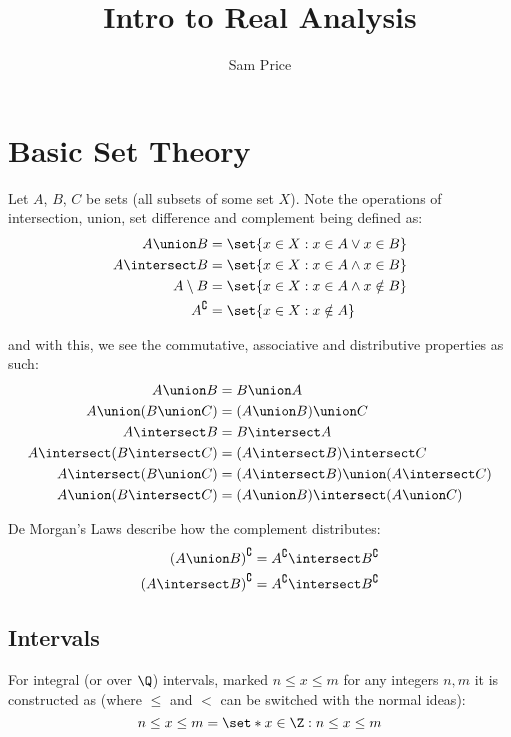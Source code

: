 \documentclass{article}
\title{Intro to Real Analysis}
\author{Sam Price}
\begin{document}
\maketitle

\section{Basic Set Theory}
Let $A$, $B$, $C$ be sets (all subsets of some set $X$).
Note the operations of intersection, union, set difference and complement being defined as:
\begin{align}
  A \union B &= \set{x \in X : x \in A \lor x \in B}\\
  A \intersect B &= \set{x \in X : x \in A \land x \in B}\\
  A \setminus B &= \set{x \in X : x \in A \land x \notin B}\\
  A^{\complement} &= \set{x \in X : x \notin A}
\end{align}

and with this, we see the commutative, associative and distributive properties as such:
\begin{align}
  A \union B &= B \union A\\
  A \union (B \union C) &= (A \union B) \union C\\
  A \intersect B &= B \intersect A\\
  A \intersect (B \intersect C) &= (A \intersect B) \intersect C\\
  A \intersect (B \union C) &= (A \intersect B) \union (A \intersect C)\\
  A \union (B \intersect C) &= (A \union B) \intersect (A \union C)
\end{align}

De Morgan's Laws describe how the complement distributes:
\begin{align}
  {(A \union B)}^{\complement} &= A^{\complement} \intersect B^{\complement}\\
  {(A \intersect B)}^{\complement} &= A^{\complement} \intersect B^{\complement}
\end{align}

\subsection{Intervals}
For integral (or over $\Q$) intervals, marked $n \le x \le m$ for any integers $n, m$ it
is constructed as (where $\le$ and $<$ can be switched with the normal ideas):
\begin{equation}
  n \le x \le m = \set*{x \in \Z : n \le x \le m}
\end{equation}
\end{document}
